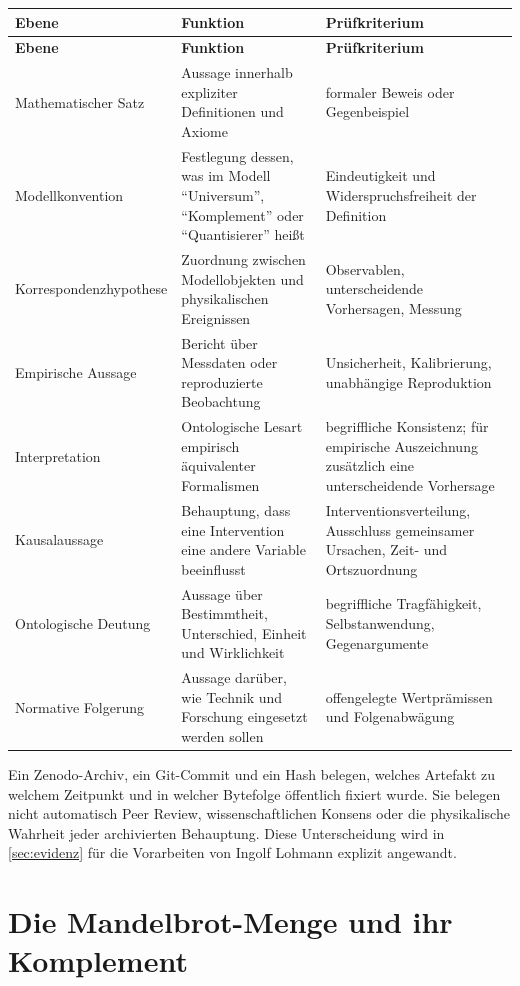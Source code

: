 \documentclass[11pt,a4paper]{article}
\theoremstyle{remark}
\begin{document}
\begin{longtable}{>{\raggedright\arraybackslash}p{}
                  >{\raggedright\arraybackslash}p{}
                  >{\raggedright\arraybackslash}p{}}
\toprule
\textbf{Ebene} & \textbf{Funktion} & \textbf{Prüfkriterium} \\
\midrule
\endfirsthead
\toprule
\textbf{Ebene} & \textbf{Funktion} & \textbf{Prüfkriterium} \\
\midrule
\endhead
Mathematischer Satz & Aussage innerhalb expliziter Definitionen und Axiome & formaler Beweis oder Gegenbeispiel \\
Modellkonvention & Festlegung dessen, was im Modell ``Universum'', ``Komplement'' oder ``Quantisierer'' heißt & Eindeutigkeit und Widerspruchsfreiheit der Definition \\
Korrespondenz\-hypothese & Zuordnung zwischen Modellobjekten und physikalischen Ereignissen & Observablen, unterscheidende Vorhersagen, Messung \\
Empirische Aussage & Bericht über Messdaten oder reproduzierte Beobachtung & Unsicherheit, Kalibrierung, unabhängige Reproduktion \\
Interpretation & Ontologische Lesart empirisch äquivalenter Formalismen & begriffliche Konsistenz; für empirische Auszeichnung zusätzlich eine unterscheidende Vorhersage \\
Kausalaussage & Behauptung, dass eine Intervention eine andere Variable beeinflusst & Interventionsverteilung, Ausschluss gemeinsamer Ursachen, Zeit- und Ortszuordnung \\
Ontologische Deutung & Aussage über Bestimmtheit, Unterschied, Einheit und Wirklichkeit & begriffliche Tragfähigkeit, Selbstanwendung, Gegenargumente \\
Normative Folgerung & Aussage darüber, wie Technik und Forschung eingesetzt werden sollen & offengelegte Wertprämissen und Folgenabwägung \\
\bottomrule
\end{longtable}

Ein Zenodo-Archiv, ein Git-Commit und ein Hash belegen, welches Artefakt zu
welchem Zeitpunkt und in welcher Bytefolge öffentlich fixiert wurde. Sie
belegen nicht automatisch Peer Review, wissenschaftlichen Konsens oder die
physikalische Wahrheit jeder archivierten Behauptung. Diese Unterscheidung
wird in \cref{sec:evidenz} für die Vorarbeiten von Ingolf Lohmann explizit
angewandt.

\section{Die Mandelbrot-Menge und ihr Komplement}
\label{sec:mandelbrot}
\end{document}
